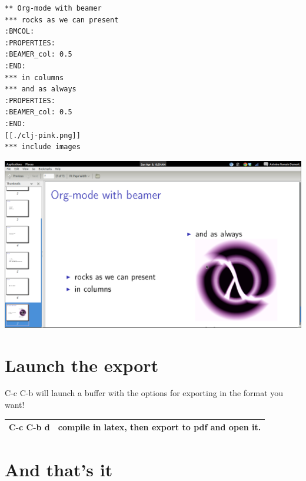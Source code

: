 \documentclass[11pt]{article}
\begin{document}
\begin{verbatim}
** Org-mode with beamer
*** rocks as we can present                                           :BMCOL:
:PROPERTIES:
:BEAMER_col: 0.5
:END:
*** in columns
*** and as always
:PROPERTIES:
:BEAMER_col: 0.5
:END:
[[./clj-pink.png]]
*** include images
\end{verbatim}

\includegraphics[width=.9\linewidth]{./org-beamer-examples/frame-org.png}
\section{Launch the export}
\label{sec-4}


C-c C-b will launch a buffer with the options for exporting in the format you want!


\begin{center}
\begin{tabular}{ll}
\hline
 C-c C-b d  &  compile in latex, then export to pdf and open it.  \\
\hline
\end{tabular}
\end{center}
\section{And that's it}
\label{sec-5}
\end{document}
